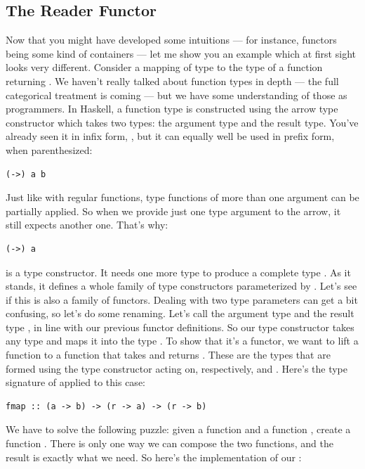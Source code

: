 \subsection{The Reader Functor}\label{the-reader-functor}

Now that you might have developed some intuitions --- for instance,
functors being some kind of containers --- let me show you an example
which at first sight looks very different. Consider a mapping of type
 to the type of a function returning . We haven't
really talked about function types in depth --- the full categorical
treatment is coming --- but we have some understanding of those as
programmers. In Haskell, a function type is constructed using the arrow
type constructor \code{(->)} which takes two types: the
argument type and the result type. You've already seen it in infix form,
, but it can equally well be used in prefix
form, when parenthesized:

\begin{Verbatim}[commandchars=\\\{\}]
(->) a b
\end{Verbatim}
Just like with regular functions, type functions of more than one
argument can be partially applied. So when we provide just one type
argument to the arrow, it still expects another one. That's why:

\begin{Verbatim}[commandchars=\\\{\}]
(->) a
\end{Verbatim}
is a type constructor. It needs one more type  to produce a
complete type . As it stands, it defines a
whole family of type constructors parameterized by . Let's see
if this is also a family of functors. Dealing with two type parameters
can get a bit confusing, so let's do some renaming. Let's call the
argument type  and the result type , in line with
our previous functor definitions. So our type constructor takes any type
 and maps it into the type . To show
that it's a functor, we want to lift a function
 to a function that takes
 and returns . These
are the types that are formed using the type constructor
 acting on, respectively,  and
. Here's the type signature of  applied to this
case:

\begin{Verbatim}[commandchars=\\\{\}]
fmap :: (a -> b) -> (r -> a) -> (r -> b)
\end{Verbatim}
We have to solve the following puzzle: given a function
 and a function
, create a function
. There is only one way we can compose the two
functions, and the result is exactly what we need. So here's the
implementation of our :

